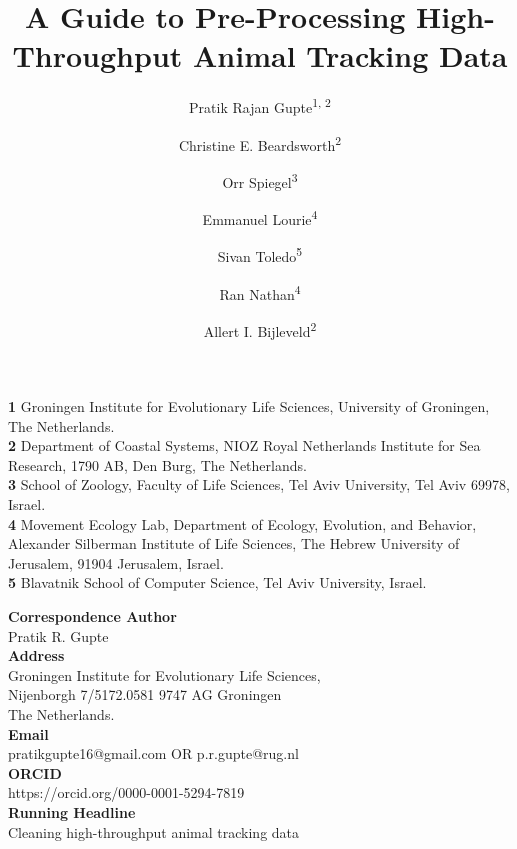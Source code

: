 \documentclass[10pt,paper=a4,headings=standardclasses
]{scrartcl}
\title{A Guide to Pre-Processing High-Throughput Animal Tracking Data}
\date{}
\author{Pratik Rajan Gupte\textsuperscript{1, 2} \and 
Christine E. Beardsworth\textsuperscript{2} \and
Orr Spiegel\textsuperscript{3} \and
Emmanuel Lourie\textsuperscript{4} \and
Sivan Toledo\textsuperscript{5} \and
Ran Nathan\textsuperscript{4} \and
Allert I. Bijleveld\textsuperscript{2}}
\begin{document}

\maketitle


\begin{flushleft}
\bigskip
\textbf{1} Groningen Institute for Evolutionary Life Sciences, University of Groningen, The Netherlands.
\\
\textbf{2} Department of Coastal Systems, NIOZ Royal Netherlands Institute for Sea Research, 1790 AB, Den Burg, The Netherlands.
\\
\textbf{3} School of Zoology, Faculty of Life Sciences, Tel Aviv University, Tel Aviv 69978, Israel.
\\
\textbf{4} Movement Ecology Lab, Department of Ecology, Evolution, and Behavior, Alexander Silberman Institute of Life Sciences, The Hebrew University of Jerusalem, 91904 Jerusalem, Israel.
\\
\textbf{5} Blavatnik School of Computer Science, Tel Aviv University, Israel.
\\
\bigskip

\textbf{Correspondence Author}
\\
Pratik R. Gupte
\\
\textbf{Address}
\\
Groningen Institute for Evolutionary Life Sciences, 
\\
Nijenborgh 7/5172.0581 9747 AG Groningen
\\
The Netherlands.
\\
\textbf{Email}
\\
pratikgupte16@gmail.com OR p.r.gupte@rug.nl
\\
\textbf{ORCID}
\\
https://orcid.org/0000-0001-5294-7819
\\
\textbf{Running Headline}
\\
Cleaning high-throughput animal tracking data

\end{flushleft}
\end{document}
